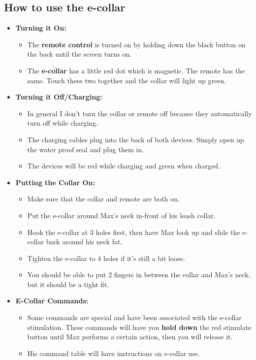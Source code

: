 \documentclass[pdftex,12pt]{article}
\begin{document}
\subsection{How to use the e-collar}
\begin{itemize}
    \item \textbf{Turning it On:}
        \begin{itemize}
            \item The \textbf{remote control} is turned on by holding
                down the black button on the back until the screen turns on.
            \item The \textbf{e-collar} has a little red dot which is magnetic. The
                remote has the same. Touch these two together and the collar
                will light up green.
        \end{itemize}
    \item \textbf{Turning it Off/Charging:}
        \begin{itemize}
            \item In general I don't turn the collar or remote off because
                they automatically turn off while charging.
            \item The charging cables plug into the back of both devices.
                Simply open up the water proof seal and plug them in.
            \item The devices will be red while charging and green when
                charged.
        \end{itemize}
    \item \textbf{Putting the Collar On:}
        \begin{itemize}
            \item Make sure that the collar and remote are both on.
            \item Put the e-collar around Max's neck in-front of his leash
                collar.
            \item Hook the e-collar at 3 holes first, then have Max look up
                and slide the e-collar back around his neck fat.
            \item Tighten the e-collar to 4 holes if it's still a bit loose.
            \item You should be able to put 2 fingers in between the collar
                and Max's neck, but it should be a tight fit.
        \end{itemize}
    \item \textbf{E-Collar Commands:}
        \begin{itemize}
            \item Some commands are special and have been associated with the e-collar stimulation.
                These commands will have you \textbf{hold down} the red stimulate button until Max performs a certain action,
                then you will release it.
            \item His command table will have instructions on e-collar use.
        \end{itemize}
\end{itemize}
\end{document}
